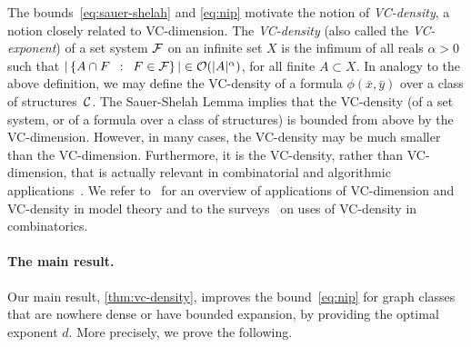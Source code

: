 \medskip
The bounds~\eqref{eq:sauer-shelah} and \eqref{eq:nip} motivate the notion of \emph{VC-density}, a notion closely related to VC-dimension.
The \emph{VC-density} (also called the 
\emph{VC-exponent})
of a set system $\cal F$
on an infinite set $X$ is the infimum of all reals $\alpha>0$ such that 
$|\setof{A\cap F}{F\in \cal F}|\in \Oof(|A|^\alpha)$, for all finite $A\subset X$. In analogy to the above definition,
we may define the VC-density of a formula $\phi(\bar x,\bar y)$ over a class of structures~$\cal C$. The Sauer-Shelah Lemma
implies that the VC-density (of a set system, or of a formula over a class of structures) is bounded from above by the VC-dimension. However, in many cases, the VC-density may be much smaller than the VC-dimension. Furthermore, it is the VC-density, rather than VC-dimension, that is actually relevant in combinatorial
and algorithmic applications~\cite{matouvsek1998geometric,Matousek:2004:BVI:1005787.1005789,Bronnimann1995}.
%
We refer to~\cite{aschenbrenner2016vapnik} for an overview of 
applications of VC-dimension and VC-density in model
theory and to the surveys~\cite{furedi1991traces,matouvsek1998geometric} 
on uses of VC-density in
combinatorics. 



\paragraph{The main result.}
Our main result, \cref{thm:vc-density}, improves the bound~\eqref{eq:nip} for graph classes that are nowhere dense or have bounded expansion,
by providing the optimal exponent $d$. More precisely, we prove the following.


